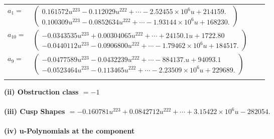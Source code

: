 \documentclass[1p]{elsarticle_modified}
\theoremstyle{definition}
\begin{document}
\begin{tabular}{m{7pt} m{180pt} m{7pt} m{180pt} }
\flushright $a_{1}=$&$\begin{pmatrix}0.161572 u^{223}-0.112029 u^{222}+\cdots-2.52455\times10^{6} u+214159.\\0.100309 u^{223}-0.0852634 u^{222}+\cdots-1.93144\times10^{6} u+168230.\end{pmatrix}$ \\
\flushright $a_{10}=$&$\begin{pmatrix}-0.0343535 u^{223}+0.00304065 u^{222}+\cdots+24150.1 u+1722.80\\-0.0440112 u^{223}-0.0906800 u^{222}+\cdots-1.79462\times10^{6} u+184517.\end{pmatrix}$ \\
\flushright $a_{9}=$&$\begin{pmatrix}-0.0477589 u^{223}-0.0432239 u^{222}+\cdots-884137. u+94093.1\\-0.0523464 u^{223}-0.113465 u^{222}+\cdots-2.23509\times10^{6} u+229689.\end{pmatrix}$\\&\end{tabular}
\flushleft \textbf{(ii) Obstruction class $= -1$}\\~\\
\flushleft \textbf{(iii) Cusp Shapes $= -0.160781 u^{223}+0.0842712 u^{222}+\cdots+3.15422\times10^{6} u-282054.$}\\~\\
\newpage\renewcommand{\arraystretch}{1}
\flushleft \textbf{(iv) u-Polynomials at the component}\newline \\
\end{document}
